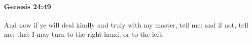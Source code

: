 
		\paragraph{Genesis 24:49} %
			\label{GENESIS-24-49}

			And now if ye will deal kindly and truly with my master, tell me: and if not, tell me; that I may turn to the right hand, or to the left.



